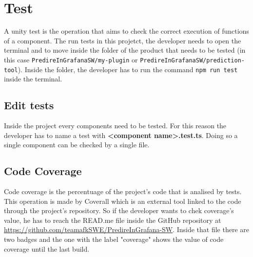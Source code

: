 \section{Test}
A unity test is the operation that aims to check the correct execution of functions of a component.
The run tests in this projetct, the developer needs to open the terminal and to move inside the folder of the product that needs to be tested (in this case \texttt{PredireInGrafanaSW/my-plugin} or \texttt{PredireInGrafanaSW/prediction-tool}). Inside the folder, the developer has to run the command \texttt{npm run test} inside the terminal. 
\subsection{Edit tests}
Inside the project every components need to be tested. For this reason the developer has to name a test with \textbf{<component name>.test.ts}. Doing so a single component can be checked by a single file.
\subsection{Code Coverage}
Code coverage is the percentuage of the project's code that is analised by tests. This operation is made by Coverall which is an external tool linked to the code through the project's repository. So if the developer wants to chek coverage's value, he has to reach the READ.me file inside the GitHub repository at \url{https://github.com/teamafkSWE/PredireInGrafana-SW}. Inside that file there are two badges and the one with the label "coverage" shows the value of code coverage until the last build.